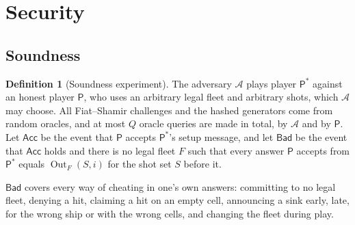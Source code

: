 \documentclass[11pt]{article}
\theoremstyle{definition}
\newtheorem{definition}[lemma]{Definition}
\theoremstyle{remark}
\newcommand{\Out}{\operatorname{Out}}
\begin{document}
\section{Security}\label{sec:security}
\subsection{Soundness}\label{sec:soundness}
\begin{definition}[Soundness experiment]\label{def:sound-exp}
The adversary $\mathcal A$ plays player $\mathsf P^\ast$ against an honest player $\mathsf P$, who uses an arbitrary legal fleet and arbitrary shots, which $\mathcal A$ may choose. All Fiat--Shamir challenges and the hashed generators come from random oracles, and at most $Q$ oracle queries are made in total, by $\mathcal A$ and by $\mathsf P$. Let $\mathsf{Acc}$ be the event that $\mathsf P$ accepts $\mathsf P^\ast$'s setup message, and let $\mathsf{Bad}$ be the event that $\mathsf{Acc}$ holds and there is no legal fleet $F$ such that every answer $\mathsf P$ accepts from $\mathsf P^\ast$ equals $\Out_F(S,i)$ for the shot set $S$ before it.
\end{definition}

$\mathsf{Bad}$ covers every way of cheating in one's own answers: committing to no legal fleet, denying a hit, claiming a hit on an empty cell, announcing a sink early, late, for the wrong ship or with the wrong cells, and changing the fleet during play.
\end{document}
